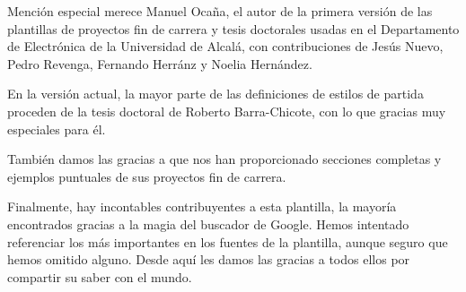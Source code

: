 Mención especial merece Manuel Ocaña, el autor de la primera versión de
las plantillas de proyectos fin de carrera y tesis doctorales usadas en
el Departamento de Electrónica de la Universidad de Alcalá, con
contribuciones de Jesús Nuevo, Pedro Revenga, Fernando Herránz y Noelia
Hernández.

En la versión actual, la mayor parte de las definiciones de estilos de
partida proceden de la tesis doctoral de Roberto Barra-Chicote, con lo
que gracias muy especiales para él.

También damos las gracias a  que nos
han proporcionado secciones completas y ejemplos puntuales de sus
proyectos fin de carrera.

Finalmente, hay incontables contribuyentes a esta plantilla, la mayoría
encontrados gracias a la magia del buscador de Google. Hemos intentado
referenciar los más importantes en los fuentes de la plantilla, aunque
seguro que hemos omitido alguno. Desde aquí les damos las gracias a
todos ellos por compartir su saber con el mundo.





